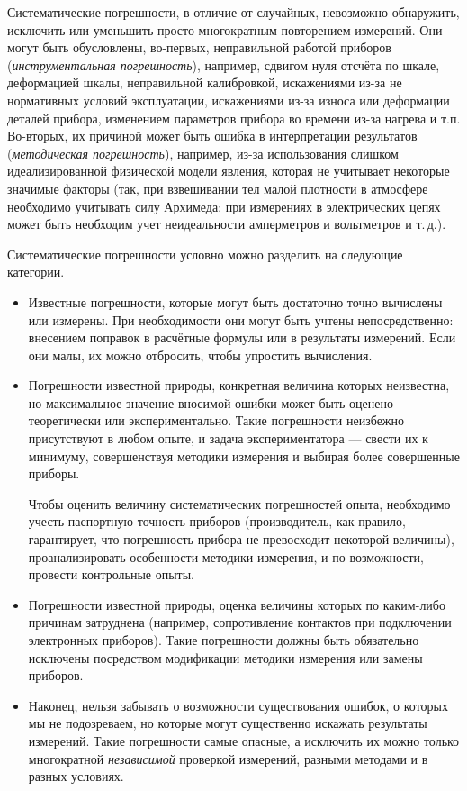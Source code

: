 Систематические погрешности, в отличие от случайных, невозможно обнаружить,
исключить или уменьшить просто многократным повторением измерений.
Они могут быть обусловлены, во-первых, неправильной работой приборов
(\emph{инструментальная погрешность}), например, сдвигом нуля отсчёта
по шкале, деформацией шкалы, неправильной калибровкой, искажениями
из-за не нормативных условий эксплуатации, искажениями из-за износа
или деформации деталей прибора, изменением параметров прибора во времени
из-за нагрева и т.п. Во-вторых, их причиной может быть ошибка в интерпретации
результатов (\emph{методическая погрешность}), например, из-за использования
слишком идеализированной физической модели явления, которая не учитывает
некоторые значимые факторы (так, при взвешивании тел малой плотности
в атмосфере необходимо учитывать силу Архимеда; при измерениях в электрических
цепях может быть необходим учет неидеальности амперметров и вольтметров
и т.\,д.).

Систематические погрешности условно можно разделить на следующие категории.

\begin{itemize}\small
    \item Известные погрешности, которые могут быть достаточно точно вычислены
или измерены. При необходимости они могут быть учтены непосредственно:
внесением поправок в расчётные формулы или в результаты измерений.
Если они малы, их можно отбросить, чтобы упростить вычисления.

    \item Погрешности известной природы, конкретная величина которых неизвестна,
но максимальное значение вносимой ошибки может быть оценено теоретически
или экспериментально. Такие погрешности неизбежно присутствуют в любом
опыте, и задача экспериментатора --- свести их к минимуму,
совершенствуя методики измерения и выбирая более совершенные приборы.

    Чтобы оценить величину систематических погрешностей опыта, необходимо
учесть паспортную точность приборов (производитель, как правило, гарантирует,
что погрешность прибора не превосходит некоторой величины), проанализировать
особенности методики измерения, и по возможности, провести контрольные
опыты.

    \item Погрешности известной природы, оценка величины которых по каким-либо
причинам затруднена (например, сопротивление контактов при подключении
электронных приборов). Такие погрешности должны быть обязательно исключены
посредством модификации методики измерения или замены приборов.

    \item Наконец, нельзя забывать о возможности существования ошибок, о
которых мы не подозреваем, но которые могут существенно искажать результаты
измерений. Такие погрешности самые опасные, а исключить их можно только
многократной \emph{независимой} проверкой измерений, разными методами
и в разных условиях.
\end{itemize}

